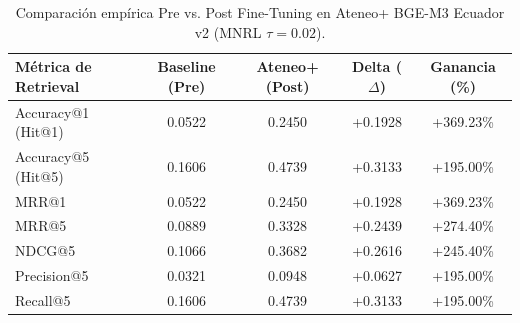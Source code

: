 \begin{table}[htbp]
\centering
\caption{Comparación empírica Pre vs. Post Fine-Tuning en Ateneo+ BGE-M3 Ecuador v2 (MNRL $\tau=0.02$).}
\label{tab:pre_post_retrieval}
\begin{tabular}{lcccc}
\toprule
\textbf{Métrica de Retrieval} & \textbf{Baseline (Pre)} & \textbf{Ateneo+ (Post)} & \textbf{Delta ($\Delta$)} & \textbf{Ganancia (\%)} \\
\midrule
    Accuracy@1 (Hit@1) & 0.0522 & 0.2450 & +0.1928 & +369.23\% \\
    Accuracy@5 (Hit@5) & 0.1606 & 0.4739 & +0.3133 & +195.00\% \\
    MRR@1 & 0.0522 & 0.2450 & +0.1928 & +369.23\% \\
    MRR@5 & 0.0889 & 0.3328 & +0.2439 & +274.40\% \\
    NDCG@5 & 0.1066 & 0.3682 & +0.2616 & +245.40\% \\
    Precision@5 & 0.0321 & 0.0948 & +0.0627 & +195.00\% \\
    Recall@5 & 0.1606 & 0.4739 & +0.3133 & +195.00\% \\
\bottomrule
\end{tabular}
\end{table}